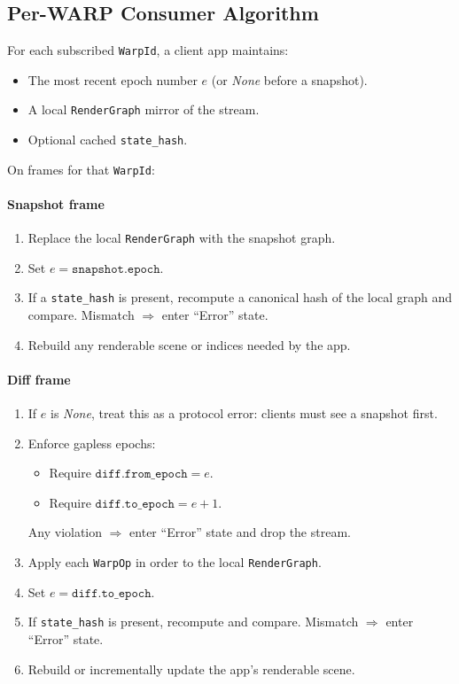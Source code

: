 \subsection{Per-WARP Consumer Algorithm}

For each subscribed \texttt{WarpId}, a client app maintains:

\begin{itemize}
  \item The most recent epoch number \(e\) (or \emph{None} before a snapshot).
  \item A local \texttt{RenderGraph} mirror of the stream.
  \item Optional cached \texttt{state\_hash}.
\end{itemize}

On frames for that \texttt{WarpId}:

\paragraph{Snapshot frame}
\begin{enumerate}
  \item Replace the local \texttt{RenderGraph} with the snapshot graph.
  \item Set \(e = \texttt{snapshot.epoch}\).
  \item If a \texttt{state\_hash} is present, recompute a canonical hash of the
        local graph and compare. Mismatch $\Rightarrow$ enter ``Error'' state.
  \item Rebuild any renderable scene or indices needed by the app.
\end{enumerate}

\paragraph{Diff frame}
\begin{enumerate}
  \item If \(e\) is \emph{None}, treat this as a protocol error: clients must
        see a snapshot first.
  \item Enforce gapless epochs:
    \begin{itemize}
      \item Require \(\texttt{diff.from\_epoch} = e\).
      \item Require \(\texttt{diff.to\_epoch} = e + 1\).
    \end{itemize}
    Any violation $\Rightarrow$ enter ``Error'' state and drop the stream.
  \item Apply each \texttt{WarpOp} in order to the local \texttt{RenderGraph}.
  \item Set \(e = \texttt{diff.to\_epoch}\).
  \item If \texttt{state\_hash} is present, recompute and compare. Mismatch
        $\Rightarrow$ enter ``Error'' state.
  \item Rebuild or incrementally update the app’s renderable scene.
\end{enumerate}


